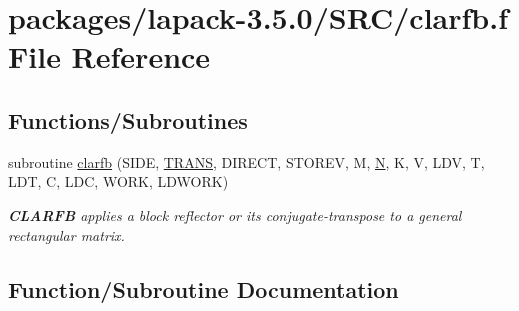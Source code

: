 \hypertarget{clarfb_8f}{}\section{packages/lapack-\/3.5.0/\+S\+R\+C/clarfb.f File Reference}
\label{clarfb_8f}
\subsection*{Functions/\+Subroutines}
\begin{DoxyCompactItemize}
\item 
subroutine \hyperlink{clarfb_8f_a625578c63463d61350ee393cd3f9aeb6}{clarfb} (S\+I\+D\+E, \hyperlink{superlu__enum__consts_8h_a0c4e17b2d5cea33f9991ccc6a6678d62a1f61e3015bfe0f0c2c3fda4c5a0cdf58}{T\+R\+A\+N\+S}, D\+I\+R\+E\+C\+T, S\+T\+O\+R\+E\+V, M, \hyperlink{polmisc_8c_a0240ac851181b84ac374872dc5434ee4}{N}, K, V, L\+D\+V, T, L\+D\+T, C, L\+D\+C, W\+O\+R\+K, L\+D\+W\+O\+R\+K)
\begin{DoxyCompactList}\small\item\em {\bfseries C\+L\+A\+R\+F\+B} applies a block reflector or its conjugate-\/transpose to a general rectangular matrix. \end{DoxyCompactList}\end{DoxyCompactItemize}


\subsection{Function/\+Subroutine Documentation}
\hypertarget{clarfb_8f_a625578c63463d61350ee393cd3f9aeb6}{}
